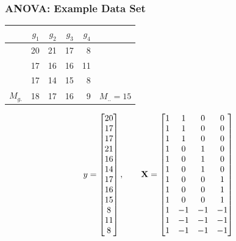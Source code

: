 \documentclass{beamer}
\begin{document}
\begin{frame}[fragile]
  \frametitle{ANOVA: Example Data Set}
\small
\begin{center}
\begin{tabular}{lrrrrr}
  \toprule
  & $g_1$ & $g_2$ & $g_3$ & $g_4$ \\
  \midrule
  & 20 & 21 & 17 & 8 & \\
  & 17 & 16 & 16 & 11 &  \\
  & 17 & 14 & 15 & 8 & \\
  \midrule
$M_{g.}$ & 18& 17 & 16 & 9 & $M_{..}=15$ \\
\bottomrule
\end{tabular}
\end{center}
%
\footnotesize
\begin{equation*}
y = \begin{bmatrix}
20 \\ 17 \\ 17 \\
21 \\ 16 \\ 14 \\
17 \\ 16 \\ 15 \\
8 \\ 11 \\ 8
\end{bmatrix}
,\qquad
\mathbf{X} = \begin{bmatrix}
1 & 1 & 0 & 0 \\
1 & 1 & 0 & 0 \\
1 & 1 & 0 & 0 \\
1 & 0 & 1 & 0 \\
1 & 0 & 1 & 0 \\
1 & 0 & 1 & 0 \\
1 & 0 & 0 & 1 \\
1 & 0 & 0 & 1 \\
1 & 0 & 0 & 1 \\
1 & -1 & -1 & -1 \\
1 & -1 & -1 & -1 \\
1 & -1 & -1 & -1
\end{bmatrix}
\end{equation*}
\end{frame}
\end{document}
